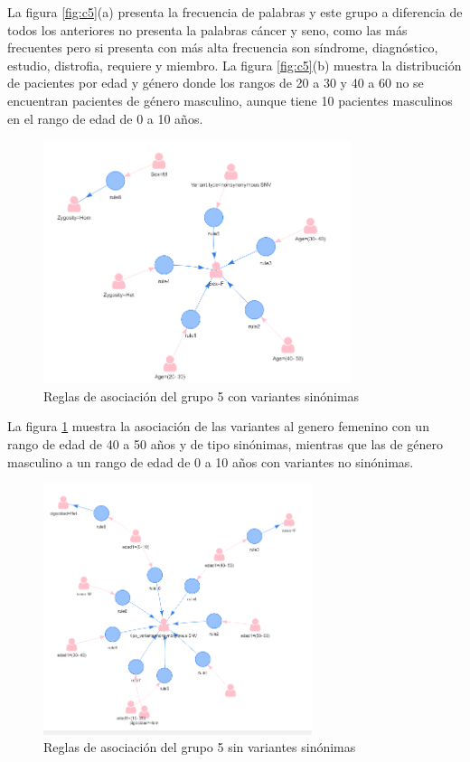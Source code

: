 La figura \ref{fig:c5}(a) presenta la frecuencia de palabras y este grupo a diferencia de todos los anteriores no presenta la palabras cáncer y seno, como las más frecuentes pero si presenta con más alta frecuencia son síndrome, diagnóstico, estudio, distrofia, requiere y miembro. La figura \ref{fig:c5}(b) muestra la distribución de pacientes por edad y género donde los rangos de 20 a 30 y 40 a 60 no se encuentran pacientes de género masculino, aunque tiene 10 pacientes masculinos en el rango de edad de 0 a 10 años.

\begin{figure}[H]
	\centering
	\includegraphics[width=0.8\textwidth]{Kap4/reglas5_1}
	\caption{Reglas de asociación del grupo 5 con variantes sinónimas} \label{fig:r5}
\end{figure}

La figura \ref{fig:r5} muestra la asociación de las variantes al genero femenino con un rango de edad de 40 a 50 años y de tipo sinónimas, mientras que las de género masculino  a un rango de edad de 0 a 10 años con variantes no sinónimas.

\begin{figure}[H]
	\centering
	\includegraphics[width=0.7\textwidth]{Kap4/reglas5_2}
	\caption{Reglas de asociación del grupo 5 sin variantes sinónimas} \label{fig:re5}
\end{figure}


